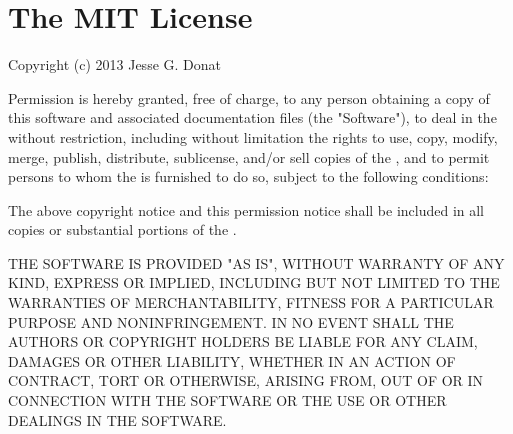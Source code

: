 \chapter{The MIT License}
\hypertarget{md_public_2glpi_2vendor_2donatj_2phpuseragentparser_2_l_i_c_e_n_s_e}{}\label{md_public_2glpi_2vendor_2donatj_2phpuseragentparser_2_l_i_c_e_n_s_e}
Copyright (c) 2013 Jesse G. Donat

Permission is hereby granted, free of charge, to any person obtaining a copy of this software and associated documentation files (the "{}\+Software"{}), to deal in the  without restriction, including without limitation the rights to use, copy, modify, merge, publish, distribute, sublicense, and/or sell copies of the , and to permit persons to whom the  is furnished to do so, subject to the following conditions\+:

The above copyright notice and this permission notice shall be included in all copies or substantial portions of the .

THE SOFTWARE IS PROVIDED "{}\+AS IS"{}, WITHOUT WARRANTY OF ANY KIND, EXPRESS OR IMPLIED, INCLUDING BUT NOT LIMITED TO THE WARRANTIES OF MERCHANTABILITY, FITNESS FOR A PARTICULAR PURPOSE AND NONINFRINGEMENT. IN NO EVENT SHALL THE AUTHORS OR COPYRIGHT HOLDERS BE LIABLE FOR ANY CLAIM, DAMAGES OR OTHER LIABILITY, WHETHER IN AN ACTION OF CONTRACT, TORT OR OTHERWISE, ARISING FROM, OUT OF OR IN CONNECTION WITH THE SOFTWARE OR THE USE OR OTHER DEALINGS IN THE SOFTWARE. 